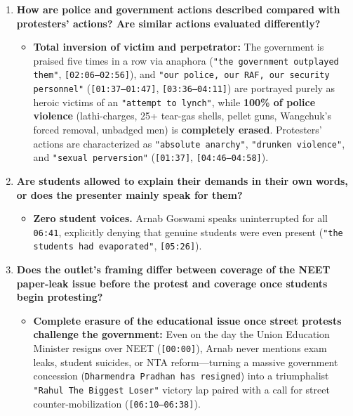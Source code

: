 \documentclass[10pt,a4paper]{article}
\begin{document}
\begin{enumerate}[leftmargin=1.6em, itemsep=4pt, topsep=4pt]
\begin{itemize}[leftmargin=1.4em, itemsep=2pt, topsep=2pt]
  \end{itemize}
  \item \textbf{How are police and government actions described compared with protesters' actions? Are similar actions evaluated differently?}
  \begin{itemize}[leftmargin=1.4em, itemsep=2pt, topsep=2pt]
    \item \textbf{Total inversion of victim and perpetrator:} The government is praised five times in a row via anaphora (\texttt{"the government outplayed them"}, \texttt{[02:06--02:56]}), and \texttt{"our police, our RAF, our security personnel"} (\texttt{[01:37--01:47]}, \texttt{[03:36--04:11]}) are portrayed purely as heroic victims of an \texttt{"attempt to lynch"}, while \textbf{100\% of police violence} (lathi-charges, 25+ tear-gas shells, pellet guns, Wangchuk's forced removal, unbadged men) is \textbf{completely erased}. Protesters' actions are characterized as \texttt{"absolute anarchy"}, \texttt{"drunken violence"}, and \texttt{"sexual perversion"} (\texttt{[01:37]}, \texttt{[04:46--04:58]}).
  \end{itemize}
  \item \textbf{Are students allowed to explain their demands in their own words, or does the presenter mainly speak for them?}
  \begin{itemize}[leftmargin=1.4em, itemsep=2pt, topsep=2pt]
    \item \textbf{Zero student voices.} Arnab Goswami speaks uninterrupted for all \texttt{06:41}, explicitly denying that genuine students were even present (\texttt{"the students had evaporated"}, \texttt{[05:26]}).
  \end{itemize}
  \item \textbf{Does the outlet's framing differ between coverage of the NEET paper-leak issue before the protest and coverage once students begin protesting?}
  \begin{itemize}[leftmargin=1.4em, itemsep=2pt, topsep=2pt]
    \item \textbf{Complete erasure of the educational issue once street protests challenge the government:} Even on the day the Union Education Minister resigns over NEET (\texttt{[00:00]}), Arnab never mentions exam leaks, student suicides, or NTA reform---turning a massive government concession (\texttt{Dharmendra Pradhan has resigned}) into a triumphalist \texttt{"Rahul The Biggest Loser"} victory lap paired with a call for street counter-mobilization (\texttt{[06:10--06:38]}).
  \end{itemize}
\end{enumerate}
\end{document}
